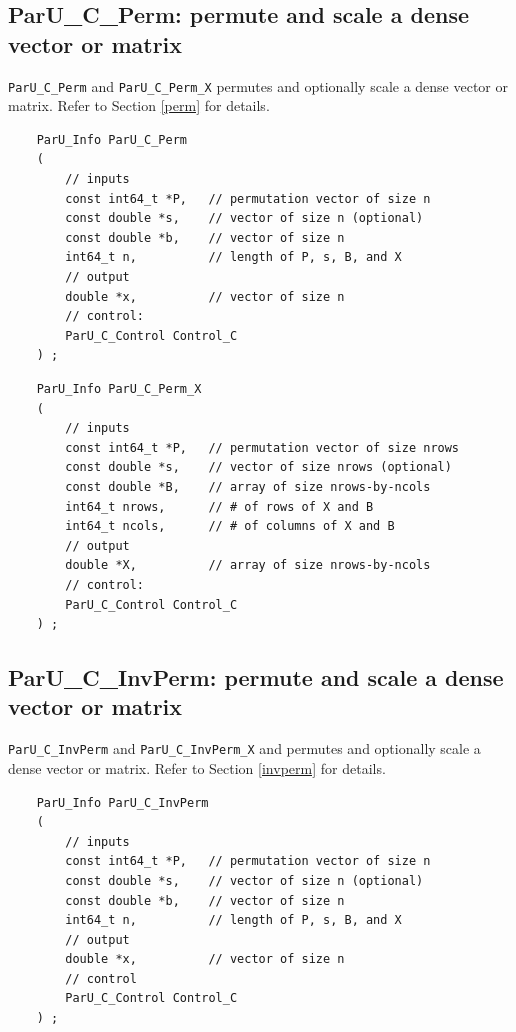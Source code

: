 \documentclass[12pt]{article}
\begin{document}
\subsection{{\sf ParU\_C\_Perm}: permute and scale a dense vector or matrix}

    \verb'ParU_C_Perm' and \verb'ParU_C_Perm_X' permutes and optionally scale a
    dense vector or matrix.  Refer to Section \ref{perm} for details.

    {\footnotesize
    \begin{verbatim}
    ParU_Info ParU_C_Perm
    (
        // inputs
        const int64_t *P,   // permutation vector of size n
        const double *s,    // vector of size n (optional)
        const double *b,    // vector of size n
        int64_t n,          // length of P, s, B, and X
        // output
        double *x,          // vector of size n
        // control:
        ParU_C_Control Control_C
    ) ; \end{verbatim} }

    {\footnotesize
    \begin{verbatim}
    ParU_Info ParU_C_Perm_X
    (
        // inputs
        const int64_t *P,   // permutation vector of size nrows
        const double *s,    // vector of size nrows (optional)
        const double *B,    // array of size nrows-by-ncols
        int64_t nrows,      // # of rows of X and B
        int64_t ncols,      // # of columns of X and B
        // output
        double *X,          // array of size nrows-by-ncols
        // control:
        ParU_C_Control Control_C
    ) ; \end{verbatim} }

\subsection{{\sf ParU\_C\_InvPerm}: permute and scale a dense vector or matrix}

    \verb'ParU_C_InvPerm' and \verb'ParU_C_InvPerm_X' and permutes and
    optionally scale a dense vector or matrix.  Refer to Section \ref{invperm}
    for details.

    {\footnotesize
    \begin{verbatim}
    ParU_Info ParU_C_InvPerm
    (
        // inputs
        const int64_t *P,   // permutation vector of size n
        const double *s,    // vector of size n (optional)
        const double *b,    // vector of size n
        int64_t n,          // length of P, s, B, and X
        // output
        double *x,          // vector of size n
        // control
        ParU_C_Control Control_C
    ) ; \end{verbatim} }
\end{document}

